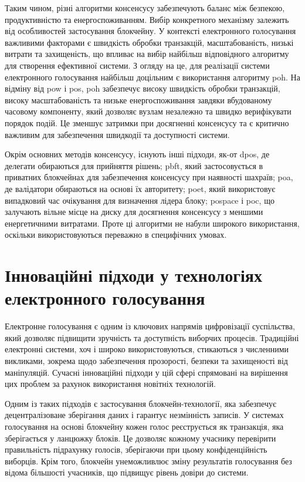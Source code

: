 \documentclass[14pt]{extreport}
\begin{document}
  Таким чином, різні алгоритми консенсусу забезпечують баланс між безпекою, продуктивністю та енергоспоживанням. Вибір конкретного механізму залежить від особливостей застосування блокчейну. У контексті електронного голосування важливими факторами є швидкість обробки транзакцій, масштабованість, низькі витрати та захищеність, що впливає на вибір найбільш відповідного алгоритму для створення ефективної системи. З огляду на це, для реалізації системи електронного голосування найбільш доцільним є використання алгоритму \gls{poh}. На відміну від \gls{pow} і \gls{pos}, \gls{poh} забезпечує високу швидкість обробки транзакцій, високу масштабованість та низьке енергоспоживання завдяки вбудованому часовому компоненту, який дозволяє вузлам незалежно та швидко верифікувати порядок подій. Це зменшує затримки при досягненні консенсусу та є критично важливим для забезпечення швидкодії та доступності системи.
  
  Окрім основних методів консенсусу, існують інші підходи, як-от \gls{dpos}, де делегати обираються для прийняття рішень; \gls{pbft}, який застосовується в приватних блокчейнах для забезпечення консенсусу при наявності шахраїв; \gls{poa}, де валідатори обираються на основі їх авторитету; \gls{poet}, який використовує випадковий час очікування для визначення лідера блоку; \gls{pospace} і \gls{poc}, що залучають вільне місце на диску для досягнення консенсусу з меншими енергетичними витратами. Проте ці алгоритми не набули широкого використання, оскільки використовуються переважно в специфічних умовах.
  
  \section{Інноваційні підходи у технологіях електронного голосування}
  
    Електронне голосування є одним із ключових напрямів цифровізації суспільства, який дозволяє підвищити зручність та доступність виборчих процесів. Традиційні електронні системи, хоч і широко використовуються, стикаються з численними викликами, зокрема щодо забезпечення прозорості, безпеки та захищеності від маніпуляцій. Сучасні інноваційні підходи у цій сфері спрямовані на вирішення цих проблем за рахунок використання новітніх технологій.

  Одним із таких підходів є застосування блокчейн-технології, яка забезпечує децентралізоване зберігання даних і гарантує незмінність записів. У системах голосування на основі блокчейну кожен голос реєструється як транзакція, яка зберігається у ланцюжку блоків. Це дозволяє кожному учаснику перевірити правильність підрахунку голосів, зберігаючи при цьому конфіденційність виборців. Крім того, блокчейн унеможливлює зміну результатів голосування без відома більшості учасників, що підвищує рівень довіри до системи.
\end{document}
